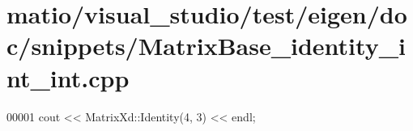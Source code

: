 \hypertarget{matio_2visual__studio_2test_2eigen_2doc_2snippets_2_matrix_base__identity__int__int_8cpp_source}{}\section{matio/visual\+\_\+studio/test/eigen/doc/snippets/\+Matrix\+Base\+\_\+identity\+\_\+int\+\_\+int.cpp}
\label{matio_2visual__studio_2test_2eigen_2doc_2snippets_2_matrix_base__identity__int__int_8cpp_source}

\begin{DoxyCode}
00001 cout << MatrixXd::Identity(4, 3) << endl;
\end{DoxyCode}
